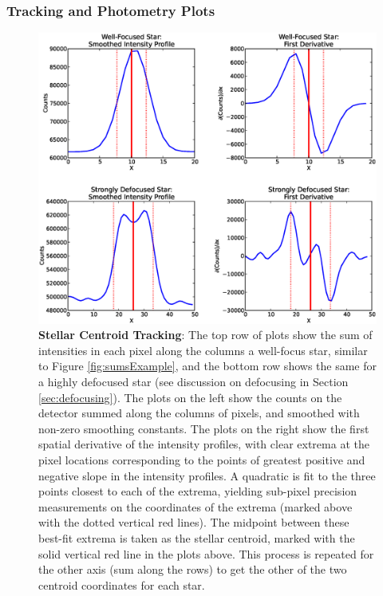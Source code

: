\documentclass[a4paper]{article}
\begin{document}
\subsubsection{Tracking and Photometry Plots}

\begin{figure}[h]
\begin{center}
\includegraphics[scale=0.45]{imgs/trackingExample.eps}
\caption{\textbf{Stellar Centroid Tracking}: The top row of plots show the sum of intensities in each pixel along the columns a well-focus star, similar to Figure \ref{fig:sumsExample}, and the bottom row shows the same for a highly defocused star (see discussion on defocusing in Section \ref{sec:defocusing}). The plots on the left show the counts on the detector summed along the columns of pixels, and smoothed with non-zero smoothing constants. The plots on the right show the first spatial derivative of the intensity profiles, with clear extrema at the pixel locations corresponding to the points of greatest positive and negative slope in the intensity profiles. A quadratic is fit to the three points closest to each of the extrema, yielding sub-pixel precision measurements on the coordinates of the extrema (marked above with the dotted vertical red lines). The midpoint between these best-fit extrema is taken as the stellar centroid, marked with the solid vertical red line in the plots above. This process is repeated for the other axis (sum along the rows) to get the other of the two centroid coordinates for each star.}
\label{fig:sumRowsAndCols}
\end{center}	
\end{figure}
\end{document}
